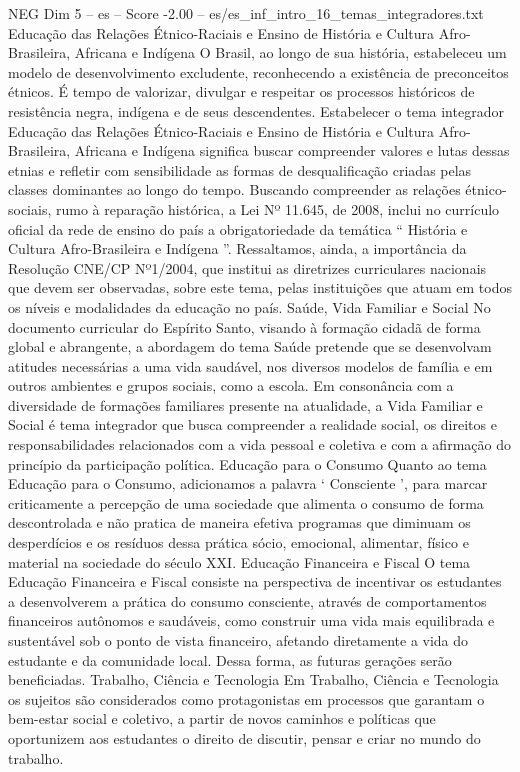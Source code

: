 \begin{textsample}{NEG Dim 5 – es – Score -2.00 – es/es\_inf\_intro\_16\_temas\_integradores.txt}
Educação das Relações Étnico-Raciais e Ensino de História e Cultura Afro-Brasileira, Africana e Indígena O Brasil, ao longo de sua história, estabeleceu um modelo de desenvolvimento excludente, reconhecendo a existência de preconceitos étnicos.
É tempo de valorizar, divulgar e respeitar os processos históricos de resistência negra, indígena e de seus descendentes.
Estabelecer o tema integrador Educação das Relações Étnico-Raciais e Ensino de História e Cultura Afro-Brasileira, Africana e Indígena significa buscar compreender valores e lutas dessas etnias e refletir com sensibilidade as formas de desqualificação criadas pelas classes dominantes ao longo do tempo.
Buscando compreender as relações étnico-sociais, rumo à reparação histórica, a Lei Nº 11.645, de 2008, inclui no currículo oficial da rede de ensino do país a obrigatoriedade da temática “ História e Cultura Afro-Brasileira e Indígena ”.
Ressaltamos, ainda, a importância da Resolução CNE/CP Nº1/2004, que institui as diretrizes curriculares nacionais que devem ser observadas, sobre este tema, pelas instituições que atuam em todos os níveis e modalidades da educação no país.
Saúde, Vida Familiar e Social No documento curricular do Espírito Santo, visando à formação cidadã de forma global e abrangente, a abordagem do tema Saúde pretende que se desenvolvam atitudes necessárias a uma vida saudável, nos diversos modelos de família e em outros ambientes e grupos sociais, como a escola.
Em consonância com a diversidade de formações familiares presente na atualidade, a Vida Familiar e Social é tema integrador que busca compreender a realidade social, os direitos e responsabilidades relacionados com a vida pessoal e coletiva e com a afirmação do princípio da participação política.
Educação para o Consumo Quanto ao tema Educação para o Consumo, adicionamos a palavra ‘ Consciente ’, para marcar criticamente a percepção de uma sociedade que alimenta o consumo de forma descontrolada e não pratica de maneira efetiva programas que diminuam os desperdícios e os resíduos dessa prática sócio, emocional, alimentar, físico e material na sociedade do século XXI.
Educação Financeira e Fiscal O tema Educação Financeira e Fiscal consiste na perspectiva de incentivar os estudantes a desenvolverem a prática do consumo consciente, através de comportamentos financeiros autônomos e saudáveis, como construir uma vida mais equilibrada e sustentável sob o ponto de vista financeiro, afetando diretamente a vida do estudante e da comunidade local.
Dessa forma, as futuras gerações serão beneficiadas.
Trabalho, Ciência e Tecnologia Em Trabalho, Ciência e Tecnologia os sujeitos são considerados como protagonistas em processos que garantam o bem-estar social e coletivo, a partir de novos caminhos e políticas que oportunizem aos estudantes o direito de discutir, pensar e criar no mundo do trabalho.

\end{textsample}
